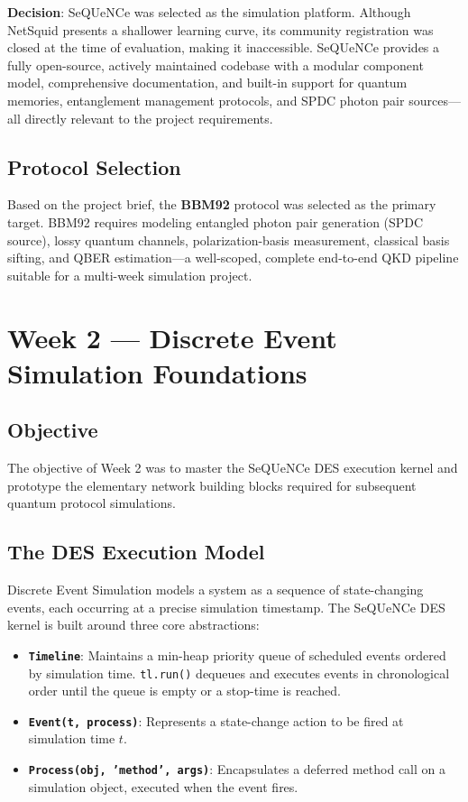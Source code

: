 \documentclass[12pt,oneside,letterpaper,english]{article}
\begin{document}
\textbf{Decision}: SeQUeNCe was selected as the simulation platform. Although NetSquid presents a shallower learning curve, its community registration was closed at the time of evaluation, making it inaccessible. SeQUeNCe provides a fully open-source, actively maintained codebase with a modular component model, comprehensive documentation, and built-in support for quantum memories, entanglement management protocols, and SPDC photon pair sources—all directly relevant to the project requirements.

\subsection{Protocol Selection}

Based on the project brief, the \textbf{BBM92} protocol was selected as the primary target. BBM92 requires modeling entangled photon pair generation (SPDC source), lossy quantum channels, polarization-basis measurement, classical basis sifting, and QBER estimation—a well-scoped, complete end-to-end QKD pipeline suitable for a multi-week simulation project.

\section{Week 2 --- Discrete Event Simulation Foundations}

\subsection{Objective}

The objective of Week 2 was to master the SeQUeNCe DES execution kernel and prototype the elementary network building blocks required for subsequent quantum protocol simulations.

\subsection{The DES Execution Model}

Discrete Event Simulation models a system as a sequence of state-changing events, each occurring at a precise simulation timestamp. The SeQUeNCe DES kernel is built around three core abstractions:

\begin{itemize}
    \item \textbf{\texttt{Timeline}}: Maintains a min-heap priority queue of scheduled events ordered by simulation time. \texttt{tl.run()} dequeues and executes events in chronological order until the queue is empty or a stop-time is reached.
    \item \textbf{\texttt{Event(t, process)}}: Represents a state-change action to be fired at simulation time $t$.
    \item \textbf{\texttt{Process(obj, 'method', args)}}: Encapsulates a deferred method call on a simulation object, executed when the event fires.
\end{itemize}
\end{document}
